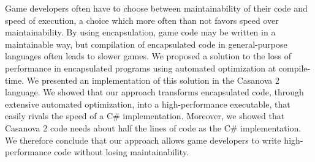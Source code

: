 Game developers often have to choose between maintainability of their code and speed of execution, a choice which more often than not favors speed over maintainability. By using encapsulation, game code may be written in a maintainable way, but compilation of encapsulated code in general-purpose languages often leads to slower games. We proposed a solution to the loss of performance in encapsulated programs using automated optimization at compile-time. 
We presented an implementation of this solution in the Casanova 2 language. We showed that our approach transforms encapsulated code, through extensive automated optimization, into a high-performance executable, that easily rivals the speed of a C\# implementation. Moreover, we showed that Casanova 2 code needs about half the lines of code as the C\# implementation. We therefore conclude that our approach allows game developers to write high-performance code without losing maintainability.




